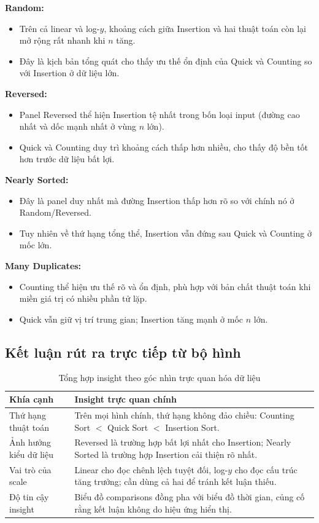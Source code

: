 \textbf{Random:}
\begin{itemize}[leftmargin=1.2cm]
    \item Trên cả linear và log-$y$, khoảng cách giữa Insertion và hai thuật toán còn lại mở rộng rất nhanh khi $n$ tăng.
    \item Đây là kịch bản tổng quát cho thấy ưu thế ổn định của Quick và Counting so với Insertion ở dữ liệu lớn.
\end{itemize}

\textbf{Reversed:}
\begin{itemize}[leftmargin=1.2cm]
    \item Panel Reversed thể hiện Insertion tệ nhất trong bốn loại input (đường cao nhất và dốc mạnh nhất ở vùng $n$ lớn).
    \item Quick và Counting duy trì khoảng cách thấp hơn nhiều, cho thấy độ bền tốt hơn trước dữ liệu bất lợi.
\end{itemize}

\textbf{Nearly Sorted:}
\begin{itemize}[leftmargin=1.2cm]
    \item Đây là panel duy nhất mà đường Insertion thấp hơn rõ so với chính nó ở Random/Reversed.
    \item Tuy nhiên về thứ hạng tổng thể, Insertion vẫn đứng sau Quick và Counting ở mốc lớn.
\end{itemize}

\textbf{Many Duplicates:}
\begin{itemize}[leftmargin=1.2cm]
    \item Counting thể hiện ưu thế rõ và ổn định, phù hợp với bản chất thuật toán khi miền giá trị có nhiều phần tử lặp.
    \item Quick vẫn giữ vị trí trung gian; Insertion tăng mạnh ở mốc $n$ lớn.
\end{itemize}

\subsection{Kết luận rút ra trực tiếp từ bộ hình}

\begin{table}[H]
\centering
\renewcommand{\arraystretch}{1.25}
\begin{tabular}{p{3.8cm}p{9.2cm}}
\toprule
\textbf{Khía cạnh} & \textbf{Insight trực quan chính} \\
\midrule
Thứ hạng thuật toán & Trên mọi hình chính, thứ hạng không đảo chiều: Counting Sort $<$ Quick Sort $<$ Insertion Sort. \\
Ảnh hưởng kiểu dữ liệu & Reversed là trường hợp bất lợi nhất cho Insertion; Nearly Sorted là trường hợp Insertion cải thiện rõ nhất. \\
Vai trò của scale & Linear cho đọc chênh lệch tuyệt đối, log-$y$ cho đọc cấu trúc tăng trưởng; cần dùng cả hai để tránh kết luận thiếu. \\
Độ tin cậy insight & Biểu đồ comparisons đồng pha với biểu đồ thời gian, củng cố rằng kết luận không do hiệu ứng hiển thị. \\
\bottomrule
\end{tabular}
\caption{Tổng hợp insight theo góc nhìn trực quan hóa dữ liệu}
\label{tab:top-insights}
\end{table}
